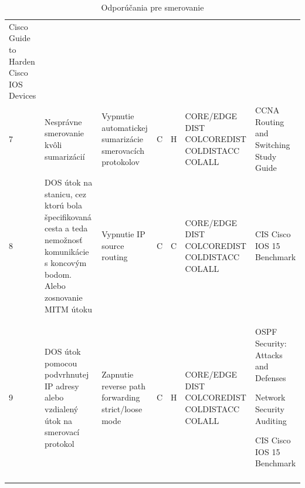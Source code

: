 \begin{longtable}[!htbp]{|C{2.5em}L{9em}L{9em}C{2em}C{2.5em}C{7.5em}L{10em}|}
	Cisco Guide to Harden Cisco IOS Devices \cite{Singh2018}\\
	 7	&Nesprávne smerovanie kvôli sumarizácií	&Vypnutie automatickej sumarizácie smerovacích protokolov	&C	&H	&CORE/EDGE
	DIST
	COLCOREDIST
	COLDISTACC
	COLALL	&CCNA Routing and Switching Study Guide \cite{Lammle2013}\\
	8	&DOS útok na stanicu, cez ktorú bola špecifikovaná cesta a teda nemožnosť komunikácie s koncovým bodom. Alebo zosnovanie MITM útoku	&Vypnutie IP source routing	&C	&C	&CORE/EDGE
	DIST
	COLCOREDIST
	COLDISTACC
	COLALL	&CIS Cisco IOS 15 Benchmark \cite{CIS_DrTLsgXv24lxeIIM}\\
	 9	&DOS útok pomocou podvrhnutej IP adresy alebo vzdialený útok na smerovací protokol	&Zapnutie reverse path forwarding strict/loose mode	&C	&H	&CORE/EDGE
	DIST
	COLCOREDIST
	COLDISTACC
	COLALL	&OSPF Security: Attacks and Defenses \cite{Khandelwal2016}
	
	Network Security Auditing \cite{Jackson2010}
	
	CIS Cisco IOS 15 Benchmark \cite{CIS_DrTLsgXv24lxeIIM}\\
	
	\hline
	\caption{Odporúčania pre smerovanie}
	\label{tab:routing}%
\end{longtable}%

